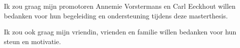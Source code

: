 Ik zou graag mijn promotoren Annemie Vorstermans en Carl Eeckhout willen bedanken voor hun begeleiding en ondersteuning tijdens deze masterthesis.

Ik zou ook graag mijn vriendin, vrienden en familie willen bedanken voor hun steun en motivatie.